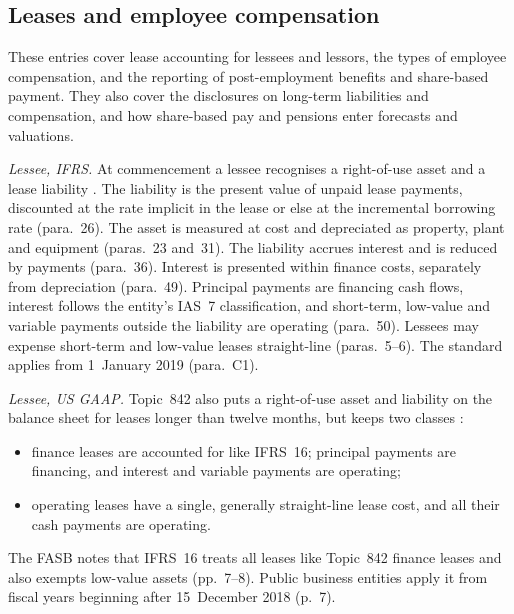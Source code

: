 \subsection{Leases and employee compensation}

These entries cover lease accounting for lessees and lessors, the types of employee compensation, and the reporting of post-employment benefits and share-based payment. They also cover the disclosures on long-term liabilities and compensation, and how share-based pay and pensions enter forecasts and valuations.

\begin{qfmethod}\label{meth:lease-reporting}
 \emph{Lessee, IFRS.} At commencement a lessee recognises a right-of-use asset and a lease liability \citep[IFRS~16 para.~22]{eu-2023-1803-ifrs16}. The liability is the present value of unpaid lease payments, discounted at the rate implicit in the lease or else at the incremental borrowing rate (para.~26). The asset is measured at cost and depreciated as property, plant and equipment (paras.~23 and~31). The liability accrues interest and is reduced by payments (para.~36). Interest is presented within finance costs, separately from depreciation (para.~49). Principal payments are financing cash flows, interest follows the entity's IAS~7 classification, and short-term, low-value and variable payments outside the liability are operating (para.~50). Lessees may expense short-term and low-value leases straight-line (paras.~5--6). The standard applies from 1~January 2019 (para.~C1).

\emph{Lessee, US GAAP.} Topic~842 also puts a right-of-use asset and liability on the balance sheet for leases longer than twelve months, but keeps two classes \citep[pp.~1--4]{us-leases-2016}:
\begin{itemize}
\item finance leases are accounted for like IFRS~16; principal payments are financing, and interest and variable payments are operating;
\item operating leases have a single, generally straight-line lease cost, and all their cash payments are operating.
\end{itemize}
The FASB notes that IFRS~16 treats all leases like Topic~842 finance leases and also exempts low-value assets (pp.~7--8). Public business entities apply it from fiscal years beginning after 15~December 2018 (p.~7).


\end{qfmethod}

